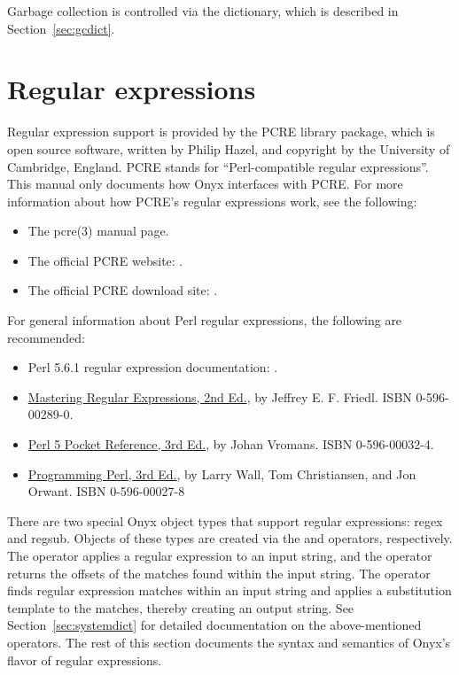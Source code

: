 Garbage collection is controlled via the 
dictionary, which is described in Section~\ref{sec:gcdict}.

\section{Regular expressions}
\label{sec:onyx_regular_expressions}

Regular expression support is provided by the PCRE library package, which is
open source software, written by Philip Hazel, and copyright by the University
of Cambridge, England.  PCRE stands for ``Perl-compatible regular
expressions''.  This manual only documents how Onyx interfaces with PCRE.  For
more information about how PCRE's regular expressions work, see the following:

\begin{itemize}
\item{The pcre(3) manual page.}
\item{The official PCRE website: .}
\item{The official PCRE download site:
.}
\end{itemize}

For general information about Perl regular expressions, the following are
recommended:

\begin{itemize}
\item{Perl 5.6.1 regular expression documentation:
.}
\item{\underline{Mastering Regular Expressions, 2nd Ed.}, by Jeffrey
E. F. Friedl.  ISBN 0-596-00289-0.}
\item{\underline{Perl 5 Pocket Reference, 3rd Ed.}, by Johan Vromans.  ISBN
0-596-00032-4.}
\item{\underline{Programming Perl, 3rd Ed.}, by Larry Wall, Tom Christiansen,
and Jon Orwant.  ISBN 0-596-00027-8}
\end{itemize}

There are two special Onyx object types that support regular expressions: regex
and regsub.  Objects of these types are created via the
 and
 operators, respectively.  The
 operator applies a regular
expression to an input string, and the
 operator returns the offsets
of the matches found within the input string.  The
 operator finds regular expression
matches within an input string and applies a substitution template to the
matches, thereby creating an output string.  See Section~\ref{sec:systemdict}
for detailed documentation on the above-mentioned operators.  The rest of this
section documents the syntax and semantics of Onyx's flavor of regular
expressions.


